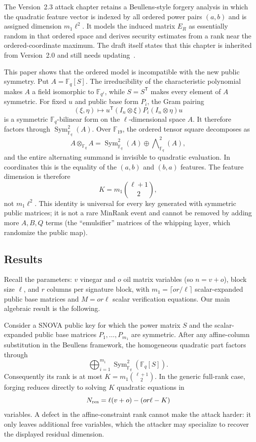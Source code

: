 \documentclass[runningheads]{llncs}
\newcommand{\F}{\mathbb F}
\newcommand{\Sym}{\operatorname{Sym}}
\newcommand{\transpose}{\mathsf T}
\newcommand{\SNOVA}{\textsf{SNOVA}}
\begin{document}
The Version~2.3 attack chapter retains a Beullens-style forgery analysis in which the quadratic feature vector is indexed by all ordered power pairs $(a,b)$ and is assigned dimension $m_1\ell^2$.  It models the induced matrix $E_R$ as essentially random in that ordered space and derives security estimates from a rank near the ordered-coordinate maximum.  The draft itself states that this chapter is inherited from Version~2.0 and still needs updating~\cite{SNOVA23}.

This paper shows that the ordered model is incompatible with the new public symmetry.  Put $A=\F_q[S]$.  The irreducibility of the characteristic polynomial makes $A$ a field isomorphic to $\F_{q^\ell}$, while $S=S^\transpose$ makes every element of $A$ symmetric.  For fixed $u$ and public base form $P_i$, the Gram pairing
\[
 (\xi,\eta)\longmapsto
 u^\transpose(I_n\otimes\xi)P_i(I_n\otimes\eta)u
\]
is a symmetric $\F_q$-bilinear form on the $\ell$-dimensional space $A$.  It therefore factors through $\Sym^2_{\F_q}(A)$.  Over $\F_{19}$, the ordered tensor square decomposes as
\[
 A\otimes_{\F_q}A
 =\Sym^2_{\F_q}(A)\oplus\bigwedge\nolimits^2_{\F_q}(A),
\]
and the entire alternating summand is invisible to quadratic evaluation.  In coordinates this is the equality of the $(a,b)$ and $(b,a)$ features.  The feature dimension is therefore
\[
 K=m_1\binom{\ell+1}{2},
\]
not $m_1\ell^2$.  This identity is universal for every key generated with symmetric public matrices; it is not a rare MinRank event and cannot be removed by adding more $A,B,Q$ terms (the ``emulsifier'' matrices of the whipping layer, which randomize the public map).

\subsection{Results}

Recall the parameters: $v$ vinegar and $o$ oil matrix variables (so $n=v+o$), block size $\ell$, and $r$ columns per signature block, with $m_1=\lceil or/\ell\rceil$ scalar-expanded public base matrices and $M=or\ell$ scalar verification equations.  Our main algebraic result is the following.

\begin{theorem}\label{thm:intro}
Consider a \SNOVA{} public key for which the power matrix $S$ and the scalar-expanded public base matrices $P_1,\ldots,P_{m_1}$ are symmetric.  After any affine-column substitution in the Beullens framework, the homogeneous quadratic part factors through
\[
 \bigoplus_{i=1}^{m_1}\Sym^2_{\F_q}(\F_q[S]).
\]
Consequently its rank is at most $K=m_1\binom{\ell+1}{2}$.  In the generic full-rank case, forging reduces directly to solving $K$ quadratic equations in
\[
 N_{\rm res}=\ell(v+o)-\left(or\ell-K\right)
\]
variables.  A defect in the affine-constraint rank cannot make the attack harder: it only leaves additional free variables, which the attacker may specialize to recover the displayed residual dimension.
\end{theorem}
\end{document}
